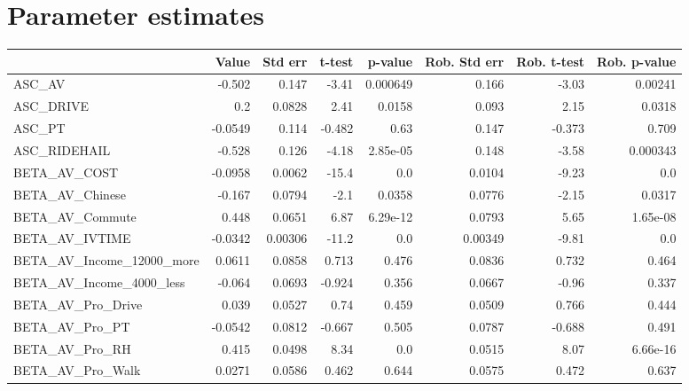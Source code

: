\section{Parameter estimates}
\begin{tabular}{lrrrrrrr}
\toprule
{} &    Value &  Std err &  t-test &  p-value &  Rob. Std err &  Rob. t-test &  Rob. p-value \\
\midrule
ASC\_AV                       &   -0.502 &    0.147 &   -3.41 & 0.000649 &         0.166 &        -3.03 &       0.00241 \\
ASC\_DRIVE                    &      0.2 &   0.0828 &    2.41 &   0.0158 &         0.093 &         2.15 &        0.0318 \\
ASC\_PT                       &  -0.0549 &    0.114 &  -0.482 &     0.63 &         0.147 &       -0.373 &         0.709 \\
ASC\_RIDEHAIL                 &   -0.528 &    0.126 &   -4.18 & 2.85e-05 &         0.148 &        -3.58 &      0.000343 \\
BETA\_AV\_COST                 &  -0.0958 &   0.0062 &   -15.4 &      0.0 &        0.0104 &        -9.23 &           0.0 \\
BETA\_AV\_Chinese              &   -0.167 &   0.0794 &    -2.1 &   0.0358 &        0.0776 &        -2.15 &        0.0317 \\
BETA\_AV\_Commute              &    0.448 &   0.0651 &    6.87 & 6.29e-12 &        0.0793 &         5.65 &      1.65e-08 \\
BETA\_AV\_IVTIME               &  -0.0342 &  0.00306 &   -11.2 &      0.0 &       0.00349 &        -9.81 &           0.0 \\
BETA\_AV\_Income\_12000\_more    &   0.0611 &   0.0858 &   0.713 &    0.476 &        0.0836 &        0.732 &         0.464 \\
BETA\_AV\_Income\_4000\_less     &   -0.064 &   0.0693 &  -0.924 &    0.356 &        0.0667 &        -0.96 &         0.337 \\
BETA\_AV\_Pro\_Drive            &    0.039 &   0.0527 &    0.74 &    0.459 &        0.0509 &        0.766 &         0.444 \\
BETA\_AV\_Pro\_PT               &  -0.0542 &   0.0812 &  -0.667 &    0.505 &        0.0787 &       -0.688 &         0.491 \\
BETA\_AV\_Pro\_RH               &    0.415 &   0.0498 &    8.34 &      0.0 &        0.0515 &         8.07 &      6.66e-16 \\
BETA\_AV\_Pro\_Walk             &   0.0271 &   0.0586 &   0.462 &    0.644 &        0.0575 &        0.472 &         0.637 \\

\end{tabular}

